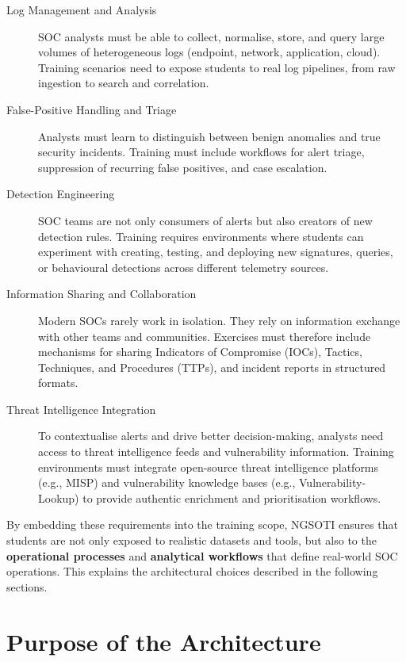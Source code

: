 \documentclass[10pt,a4paper]{report}
\begin{document}
\begin{description}
    \item [Log Management and Analysis] SOC analysts must be able to collect,
          normalise, store, and query large volumes of heterogeneous logs
          (endpoint, network, application, cloud). Training scenarios need
          to expose students to real log pipelines, from raw ingestion to
          search and correlation.
    \item [ False-Positive Handling and Triage ] Analysts must learn to
          distinguish between benign anomalies and true security incidents.
          Training must include workflows for alert triage, suppression of
          recurring false positives, and case escalation.
    \item [Detection Engineering] SOC teams are not only consumers of alerts
          but also creators of new detection rules. Training requires
          environments where students can experiment with creating, testing,
          and deploying new signatures, queries, or behavioural detections
          across different telemetry sources.
    \item [Information Sharing and Collaboration] Modern SOCs rarely work in
          isolation. They rely on information exchange with other teams and
          communities. Exercises must therefore include mechanisms for sharing
          Indicators of Compromise (IOCs), Tactics, Techniques, and
          Procedures (TTPs), and incident reports in structured formats.
    \item [Threat Intelligence Integration] To contextualise alerts and drive
          better decision-making, analysts need access to threat intelligence
          feeds and vulnerability information. Training environments must
          integrate open-source threat intelligence platforms (e.g., MISP) and
          vulnerability knowledge bases (e.g., Vulnerability-Lookup) to provide
          authentic enrichment and prioritisation workflows.
\end{description}


By embedding these requirements into the training scope, NGSOTI ensures that
students are not only exposed to realistic datasets and tools, but also to
the \textbf{operational processes} and \textbf{analytical workflows} that
define real-world SOC operations.
This explains the architectural choices described in the following sections.

\section{Purpose of the Architecture}
\end{document}
